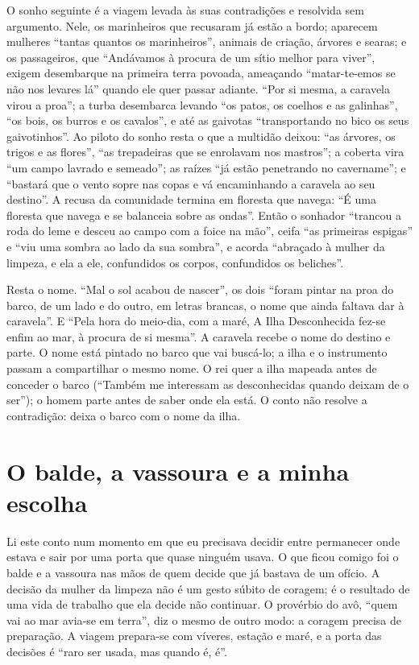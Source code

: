 \documentclass[12pt]{article}
\begin{document}
O sonho seguinte é a viagem levada às suas contradições e resolvida sem argumento. Nele, os marinheiros que recusaram já estão a bordo; aparecem mulheres ``tantas quantos os marinheiros'', animais de criação, árvores e searas; e os passageiros, que ``Andávamos à procura de um sítio melhor para viver'', exigem desembarque na primeira terra povoada, ameaçando ``matar-te-emos se não nos levares lá'' quando ele quer passar adiante. ``Por si mesma, a caravela virou a proa''; a turba desembarca levando ``os patos, os coelhos e as galinhas'', ``os bois, os burros e os cavalos'', e até as gaivotas ``transportando no bico os seus gaivotinhos''. Ao piloto do sonho resta o que a multidão deixou: ``as árvores, os trigos e as flores'', ``as trepadeiras que se enrolavam nos mastros''; a coberta vira ``um campo lavrado e semeado''; as raízes ``já estão penetrando no cavername''; e ``bastará que o vento sopre nas copas e vá encaminhando a caravela ao seu destino''. A recusa da comunidade termina em floresta que navega: ``É uma floresta que navega e se balanceia sobre as ondas''. Então o sonhador ``trancou a roda do leme e desceu ao campo com a foice na mão'', ceifa ``as primeiras espigas'' e ``viu uma sombra ao lado da sua sombra'', e acorda ``abraçado à mulher da limpeza, e ela a ele, confundidos os corpos, confundidos os beliches''.

Resta o nome. ``Mal o sol acabou de nascer'', os dois ``foram pintar na proa do barco, de um lado e do outro, em letras brancas, o nome que ainda faltava dar à caravela''. E ``Pela hora do meio-dia, com a maré, A Ilha Desconhecida fez-se enfim ao mar, à procura de si mesma''. A caravela recebe o nome do destino e parte. O nome está pintado no barco que vai buscá-lo; a ilha e o instrumento passam a compartilhar o mesmo nome. O rei quer a ilha mapeada antes de conceder o barco (``Também me interessam as desconhecidas quando deixam de o ser''); o homem parte antes de saber onde ela está. O conto não resolve a contradição: deixa o barco com o nome da ilha.

\section{O balde, a vassoura e a minha escolha}

Li este conto num momento em que eu precisava decidir entre permanecer onde estava e sair por uma porta que quase ninguém usava. O que ficou comigo foi o balde e a vassoura nas mãos de quem decide que já bastava de um ofício. A decisão da mulher da limpeza não é um gesto súbito de coragem; é o resultado de uma vida de trabalho que ela decide não continuar. O provérbio do avô, ``quem vai ao mar avia-se em terra'', diz o mesmo de outro modo: a coragem precisa de preparação. A viagem prepara-se com víveres, estação e maré, e a porta das decisões é ``raro ser usada, mas quando é, é''.
\end{document}
